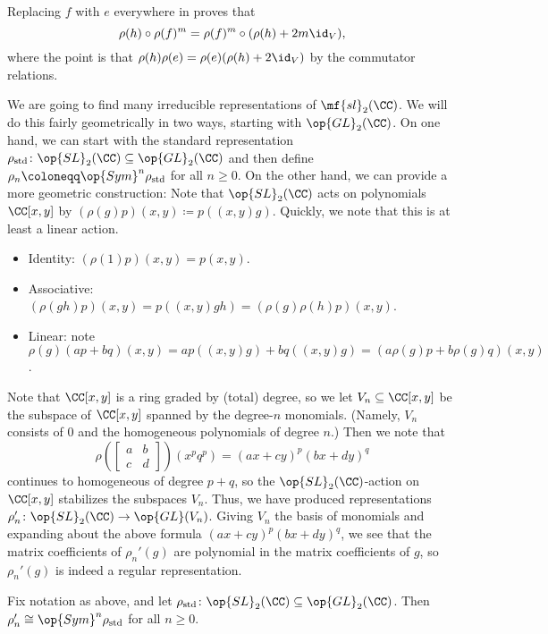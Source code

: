 \documentclass[../notes.tex]{subfiles}
\begin{document}
\begin{example}
	Replacing $f$ with $e$ everywhere in  proves that
	\[\rho(h)\circ\rho(f)^m=\rho(f)^m\circ(\rho(h)+2m{\id_V}),\]
	where the point is that $\rho(h)\rho(e)=\rho(e)(\rho(h)+2{\id_V})$ by the commutator relations.
\end{example}
We are going to find many irreducible representations of $\mf{sl}_2(\CC)$. We will do this fairly geometrically in two ways, starting with $\op{GL}_2(\CC)$. On one hand, we can start with the standard representation $\rho_{\mathrm{std}}\colon\op{SL}_2(\CC)\subseteq\op{GL}_2(\CC)$ and then define $\rho_n\coloneqq\op{Sym}^n\rho_{\mathrm{std}}$ for all $n\ge0$. On the other hand, we can provide a more geometric construction: 
Note that $\op{SL}_2(\CC)$ acts on polynomials $\CC[x,y]$ by $(\rho(g)p)(x,y)\coloneqq p\left((x,y)g\right)$. Quickly, we note that this is at least a linear action.
\begin{itemize}
	\item Identity: $(\rho(1)p)(x,y)=p(x,y)$.
	\item Associative: $(\rho(gh)p)(x,y)=p\left((x,y)gh\right)=(\rho(g)\rho(h)p)(x,y)$.
	\item Linear: note $\rho(g)(ap+bq)(x,y)=ap\left((x,y)g\right)+bq\left((x,y)g\right)=(a\rho(g)p+b\rho(g)q)(x,y)$.
\end{itemize}
Note that $\CC[x,y]$ is a ring graded by (total) degree, so we let $V_n\subseteq\CC[x,y]$ be the subspace of $\CC[x,y]$ spanned by the degree-$n$ monomials. (Namely, $V_n$ consists of $0$ and the homogeneous polynomials of degree $n$.) Then we note that
\[\rho\left(\begin{bmatrix}
	a & b \\ c & d
\end{bmatrix}\right)\left(x^pq^p\right)=(ax+cy)^p(bx+dy)^q\]
continues to homogeneous of degree $p+q$, so the $\op{SL}_2(\CC)$-action on $\CC[x,y]$ stabilizes the subspaces $V_n$. Thus, we have produced representations $\rho_n'\colon\op{SL}_2(\CC)\to\op{GL}(V_n)$. Giving $V_n$ the basis of monomials and expanding about the above formula $(ax+cy)^p(bx+dy)^q$, we see that the matrix coefficients of $\rho_n'(g)$ are polynomial in the matrix coefficients of $g$, so $\rho_n'(g)$ is indeed a regular representation.
\begin{lemma} \label{lem:sl2-poly-is-sym-power}
	Fix notation as above, and let $\rho_{\mathrm{std}}\colon\op{SL}_2(\CC)\subseteq\op{GL}_2(\CC)$. Then $\rho_n'\cong\op{Sym}^n\rho_{\mathrm{std}}$ for all $n\ge0$.
\end{lemma}
\end{document}
